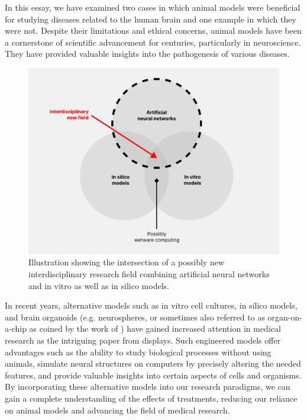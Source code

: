 \documentclass[10pt]{article}
\begin{document}
\begin{sloppypar}
  In this essay, we have examined two cases in which animal models were beneficial for studying diseases related to the human brain and one example in which they were not. Despite their limitations and ethical concerns, animal models have been a cornerstone of scientific advancement for centuries, particularly in neuroscience. They have provided valuable insights into the pathogenesis of various diseases.

  \vspace{10pt} %
  \begin{figure}[ht]
    \centering
    \includegraphics[width=\textwidth]{figures/new-discipline.png}
    \caption[Illustration showing the intersection of a possibly new interdisciplinary research field combining artificial neural networks and in vitro as well as in silico models.]{Illustration showing the intersection of a possibly new interdisciplinary research field combining artificial neural networks and in vitro as well as in silico models.}
    \label{fig:new-discipline}
  \end{figure}

  In recent years, alternative models such as in vitro cell cultures, in silico models, and brain organoids (e.g. neurospheres, or sometimes also referred to as organ-on-a-chip as coined by the work of \cite{huh_reconstituting_2010}) have gained increased attention in medical research as the intriguing paper from \cite{t_rohn_potential_2018} displays. Such engineered models offer advantages such as the ability to study biological processes without using animals, simulate neural structures on computers by precisely altering the needed features, and provide valuable insights into certain aspects of cells and organisms. By incorporating these alternative models into our research paradigms, we can gain a complete understanding of the effects of treatments, reducing our reliance on animal models and advancing the field of medical research.


\end{sloppypar}
\end{document}
